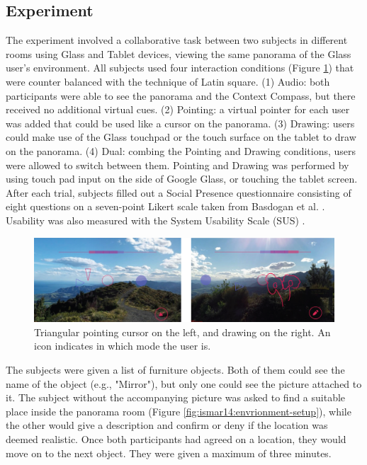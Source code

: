 \subsection{Experiment}

The experiment involved a collaborative task between two subjects in different rooms using Glass and Tablet devices, viewing the same panorama of the Glass user's environment. All subjects used four interaction conditions (Figure \ref{fig:ismar14:pointing-drawing}) that were counter balanced with the technique of Latin square.
(1) Audio: both participants were able to see the panorama and the Context Compass, but there received no additional virtual cues. 
(2) Pointing: a virtual pointer for each user was added that could be used like a cursor on the panorama.
(3) Drawing: users could make use of the Glass touchpad or the touch surface on the tablet to draw on the panorama. 
(4) Dual: combing the Pointing and Drawing conditions, users were allowed to switch between them.
Pointing and Drawing was performed by using touch pad input on the side of Google Glass, or touching the tablet screen. After each trial, subjects filled out a Social Presence questionnaire consisting of eight questions on a seven-point Likert scale taken from Basdogan et al. \cite{Basdogan2001}. Usability was also measured with the System Usability Scale (SUS) \cite{brooke1996sus}.

\begin{figure}[ht]
	\centering
	\includegraphics[width=\linewidth]{images/ismar14/pointing-drawing}
	\caption{Triangular pointing cursor on the left, and drawing on the right. An icon indicates in which mode the user is.}
	\label{fig:ismar14:pointing-drawing}
\end{figure}

The subjects were given a list of furniture objects. Both of them could see the name of the object (e.g., "Mirror"), but only one could see the picture attached to it. The subject without the accompanying picture was asked to find a suitable place inside the panorama room (Figure \ref{fig:ismar14:envrionment-setup}), while the other would give a description and confirm or deny if the location was deemed realistic. Once both participants had agreed on a location, they would move on to the next object. They were given a maximum of three minutes.

